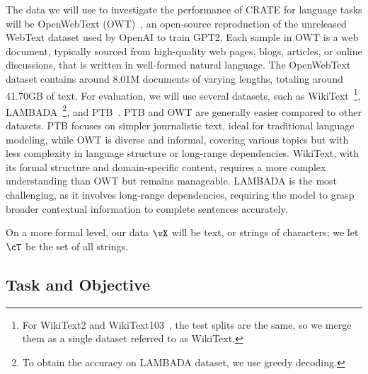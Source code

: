 \documentclass[../../book-main.tex]{subfiles}
\begin{document}
The data we will use to investigate the performance of CRATE for language tasks will be OpenWebText (OWT)~\cite{Gokaslan2019OpenWeb}, an open-source reproduction of the unreleased WebText dataset used by OpenAI to train GPT2. Each sample in OWT is a web document, typically sourced from high-quality web pages, blogs, articles, or online discussions, that is written in well-formed natural language. The OpenWebText dataset contains around 8.01M documents of varying lengths, totaling around 41.70GB of text. For evaluation, we will use several datasets, such as WikiText~\cite{merity2016pointer}\footnote{For WikiText2 and WikiText103~\cite{merity2016pointer}, the test splits are the same, so we merge them as a single dataset referred to as WikiText.}, LAMBADA~\cite{paperno2016lambadadatasetwordprediction}\footnote{To obtain the accuracy on LAMBADA dataset, we use greedy decoding.}, and PTB~\cite{marcus-etal-1993-building}. PTB and OWT are generally easier compared to other datasets. PTB focuses on simpler journalistic text, ideal for traditional language modeling, while OWT is diverse and informal, covering various topics but with less complexity in language structure or long-range dependencies. WikiText, with its formal structure and domain-specific content, requires a more complex understanding than OWT but remains manageable. LAMBADA is the most challenging, as it involves long-range dependencies, requiring the model to grasp broader contextual information to complete sentences accurately. 

On a more formal level, our data \(\vX\) will be text, or strings of characters; we let \(\cT\) be the set of all strings.

\subsection{Task and Objective} \label{sub:clm_text_objective}
\end{document}
